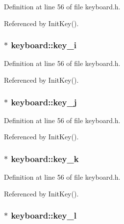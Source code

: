 Definition at line 56 of file keyboard.h.

Referenced by Init\-Key().
\subsubsection{ $\ast$ {\bf keyboard::key\_\-i}\hspace{0.3cm}{\tt  [private]}}\label{classkeyboard_keyboardr8}




Definition at line 56 of file keyboard.h.

Referenced by Init\-Key().
\subsubsection{ $\ast$ {\bf keyboard::key\_\-j}\hspace{0.3cm}{\tt  [private]}}\label{classkeyboard_keyboardr9}




Definition at line 56 of file keyboard.h.

Referenced by Init\-Key().
\subsubsection{ $\ast$ {\bf keyboard::key\_\-k}\hspace{0.3cm}{\tt  [private]}}\label{classkeyboard_keyboardr10}




Definition at line 56 of file keyboard.h.

Referenced by Init\-Key().
\subsubsection{ $\ast$ {\bf keyboard::key\_\-l}\hspace{0.3cm}{\tt  [private]}}\label{classkeyboard_keyboardr11}




